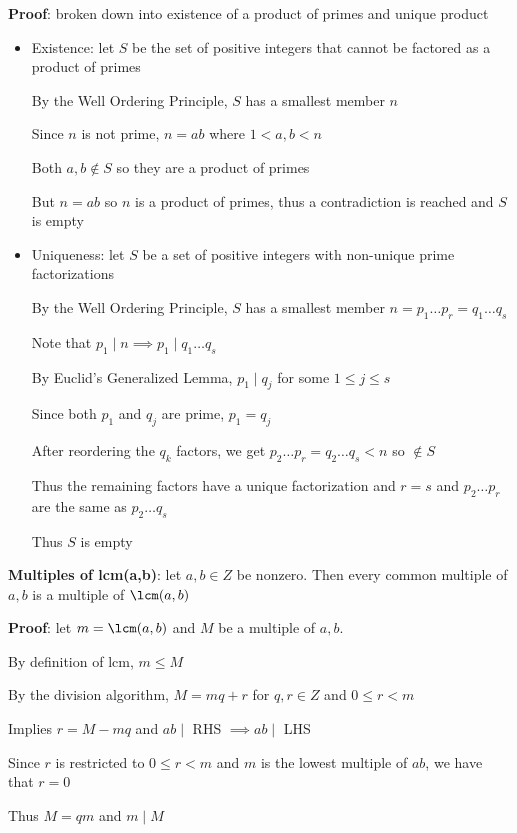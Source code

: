 \documentclass{article}
\begin{document}
 \textbf{Proof}: broken down into existence of a product of primes and unique product
 \begin{itemize}
   \item Existence: let $S$ be the set of positive integers that cannot be factored as a product of primes

     By the Well Ordering Principle, $S$ has a smallest member $n$

     Since $n$ is not prime, $n = ab$ where $1 < a, b < n$

     Both $a, b \notin S$ so they are a product of primes

     But $n = ab$ so $n$ is a product of primes, thus a contradiction is reached and $S$ is empty
  
   \item Uniqueness: let $S$ be a set of positive integers with non-unique prime factorizations

     By the Well Ordering Principle, $S$ has a smallest member $n = p_1 \ldots p_r = q_1 \ldots q_s$

     Note that $p_1 \mid n \implies p_1 \mid q_1 \ldots q_s$

     By Euclid's Generalized Lemma, $p_1 \mid q_j$ for some $1 \leq j \leq s$

     Since both $p_1$ and $q_j$ are prime, $p_1 = q_j$

     After reordering the $q_k$ factors, we get $p_2 \ldots p_r = q_2 \ldots q_s < n$ so $\notin S$

     Thus the remaining factors have a unique factorization and $r = s$ and $p_2 \ldots p_r$ are the same as $p_2 \ldots q_s$

     Thus $S$ is empty
 \end{itemize}
 \bigskip

 \textbf{Multiples of lcm(a,b)}: let $a,b \in Z$ be nonzero. Then every common multiple of $a,b$ is a multiple of $\lcm(a, b)$

 \textbf{Proof}: let $m = \lcm(a, b)$ and $M$ be a multiple of $a,b$. 

 By definition of lcm, $m \leq M$

 By the division algorithm, $M = mq + r$ for $q, r \in Z$ and $0 \leq r < m$

 Implies $r = M - mq$ and $ab \mid$ RHS $\implies ab \mid$ LHS

 Since $r$ is restricted to $0 \leq r < m$ and $m$ is the lowest multiple of $ab$, we have that $r = 0$

 Thus $M = qm$ and $m \mid M$
\end{document}
